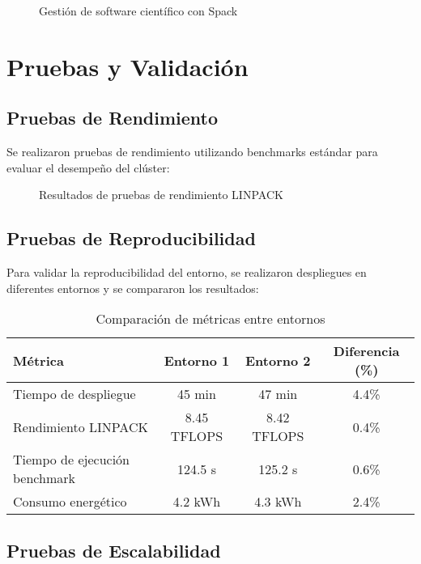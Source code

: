 \documentclass[12pt,a4paper]{report}
\begin{document}
\begin{figure}[H]
\centering
\caption{Gestión de software científico con Spack}
\label{fig:spack_software}
\end{figure}

\section{Pruebas y Validación}

\subsection{Pruebas de Rendimiento}

Se realizaron pruebas de rendimiento utilizando benchmarks estándar para evaluar el desempeño del clúster:

\begin{figure}[H]
\centering
\caption{Resultados de pruebas de rendimiento LINPACK}
\label{fig:performance_tests}
\end{figure}

\subsection{Pruebas de Reproducibilidad}

Para validar la reproducibilidad del entorno, se realizaron despliegues en diferentes entornos y se compararon los resultados:

\begin{table}[H]
\centering
\begin{tabular}{|l|c|c|c|}
\hline
\textbf{Métrica} & \textbf{Entorno 1} & \textbf{Entorno 2} & \textbf{Diferencia (\%)} \\
\hline
Tiempo de despliegue & 45 min & 47 min & 4.4\% \\
\hline
Rendimiento LINPACK & 8.45 TFLOPS & 8.42 TFLOPS & 0.4\% \\
\hline
Tiempo de ejecución benchmark & 124.5 s & 125.2 s & 0.6\% \\
\hline
Consumo energético & 4.2 kWh & 4.3 kWh & 2.4\% \\
\hline
\end{tabular}
\caption{Comparación de métricas entre entornos}
\label{tab:reproducibility}
\end{table}

\subsection{Pruebas de Escalabilidad}
\end{document}
